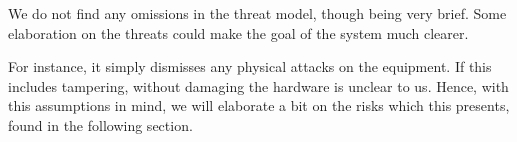 
We do not find any omissions in the threat model, though being very
brief. Some elaboration on the threats could make the goal of the
system much clearer.

For instance, it simply dismisses any physical attacks on the
equipment. If this includes tampering, without damaging the hardware
is unclear to us. Hence, with this assumptions in mind, we will
elaborate a bit on the risks which this presents, found in the
following section.
